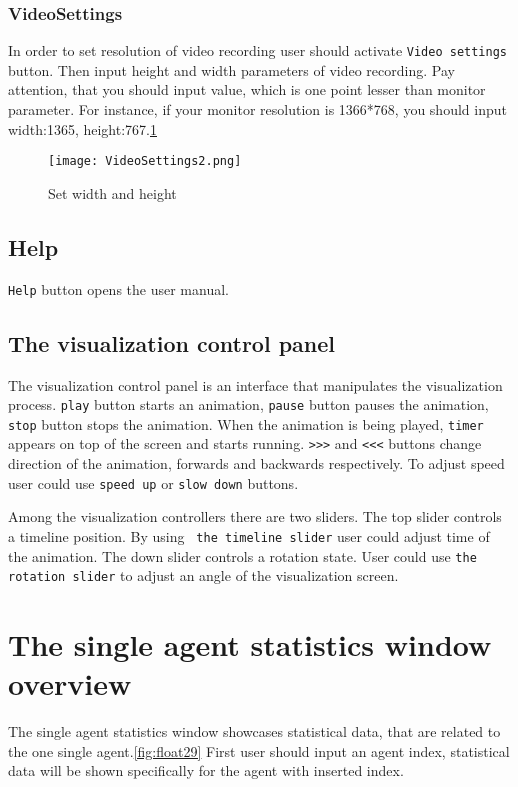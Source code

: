 \documentclass[thesis=B,english]{FITthesis}[2019/12/23]
\begin{document}
\subsubsection{VideoSettings}

In order to set resolution of video recording user should activate \verb|Video settings| button. Then input height and width parameters of video recording. Pay attention, that you should input value, which is one point lesser than monitor parameter. For instance, if your monitor resolution is 1366*768, you should input width:1365, height:767.\ref{fig:float28} 


\begin{figure}
	\texttt{[image: VideoSettings2.png]}
	\caption[Video settings]{Set width and height}\label{fig:float28}
\end{figure}


\subsection{Help}

\verb|Help| button opens the user manual.

\subsection{The visualization control panel}

The visualization control panel is an interface that manipulates the visualization process. \verb|play| button starts an animation, \verb|pause| button pauses the animation, \verb|stop| button stops the animation. When the animation is being played,  \verb|timer| appears on top of the screen and starts running. \verb|>>>| and \verb|<<<| buttons change direction of the animation, forwards and backwards respectively. To adjust speed user could use \verb|speed up| or \verb|slow down| buttons. 

Among the visualization controllers there are two sliders. The top slider controls a timeline position. By using \verb| the timeline slider| user could adjust time of the animation. The down slider controls a rotation state. User could use \verb|the rotation slider| to adjust an angle of the visualization screen.

\section{The single agent statistics window overview}

The single agent statistics window showcases statistical data, that are related to the one single agent.\ref{fig:float29} First user should input an agent index, statistical data will be shown specifically for the agent with inserted index.
\end{document}
